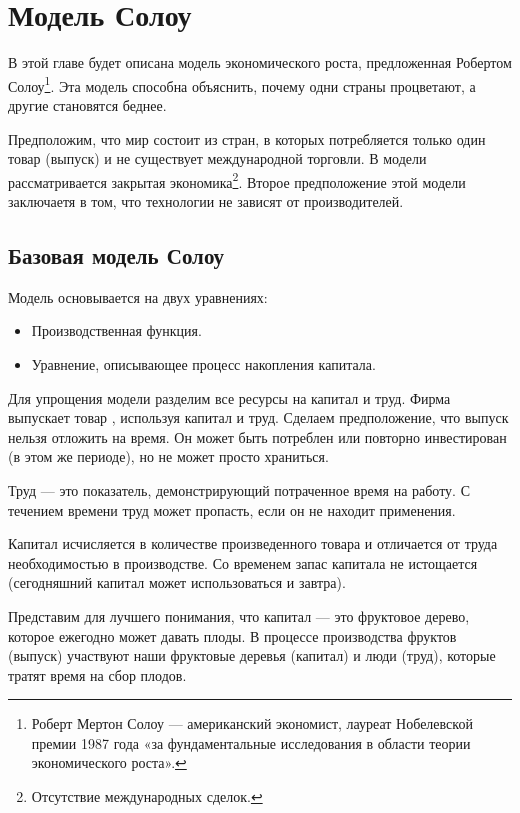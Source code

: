 \chapter{Модель Солоу}
\label{cha:solow_models}

В этой главе будет описана модель экономического роста, предложенная Робертом Солоу\footnote{Роберт Мертон Солоу --- американский экономист, лауреат Нобелевской премии 1987 года «за фундаментальные исследования в области теории экономического роста»\cite{wiki:Robert_Solow}.}.
Эта модель способна объяснить, почему одни страны процветают, а другие становятся беднее.

Предположим, что мир состоит из стран, в которых потребляется только один товар (выпуск) и не существует международной торговли.
В модели рассматривается закрытая экономика\footnote{Отсутствие международных сделок.}.
Второе предположение этой модели заключаетя в том, что технологии не зависят от производителей.

\section{Базовая модель Солоу}

Модель основывается на двух уравнениях:
\begin{itemize}
	\item Производственная функция.
	\item Уравнение, описывающее процесс накопления капитала.
\end{itemize}

Для упрощения модели разделим все ресурсы на капитал и труд.
Фирма выпускает товар , используя капитал и труд.
Сделаем предположение, что выпуск нельзя отложить на время.
Он может быть потреблен или повторно инвестирован (в этом же периоде), но не может просто храниться.

Труд --- это показатель, демонстрирующий потраченное время на работу.
С течением времени труд может пропасть, если он не находит применения.

Капитал исчисляется в количестве произведенного товара и отличается от труда необходимостью в производстве.
Со временем запас капитала не истощается (сегодняшний капитал может использоваться и завтра).

Представим для лучшего понимания, что капитал --- это фруктовое дерево, которое ежегодно может давать плоды.
В процессе производства фруктов (выпуск) участвуют наши фруктовые деревья (капитал) и люди (труд), которые тратят время на сбор плодов.

